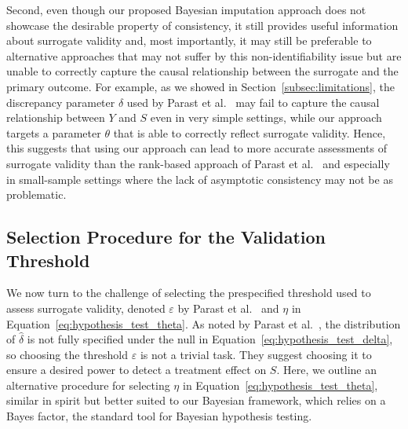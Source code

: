 \documentclass[12pt]{article}
\begin{document}
Second, even though our proposed Bayesian imputation approach does not showcase the desirable property of consistency, it still provides useful information about surrogate validity and, most importantly, it may still be preferable to alternative approaches that may not suffer by this non-identifiability issue but are unable to correctly capture the causal relationship between the surrogate and the primary outcome. For example, as we showed in Section~\ref{subsec:limitations}, the discrepancy parameter \(\delta\) used by Parast et al.\ \citep{parast2024rank} may fail to capture the causal relationship between \(Y\) and \(S\) even in very simple settings, while our approach targets a parameter \(\theta\) that is able to correctly reflect surrogate validity. Hence, this suggests that using our approach can lead to more accurate assessments of surrogate validity than the rank-based approach of Parast et al.\ \citep{parast2024rank} and especially in small-sample settings where the lack of asymptotic consistency may not be as problematic.

\subsection{Selection Procedure for the Validation Threshold}\label{subsec:alternative_threshold}

We now turn to the challenge of selecting the prespecified threshold used to assess surrogate validity, denoted \(\varepsilon\) by Parast et al.\ \citep{parast2024rank} and \(\eta\) in Equation~\eqref{eq:hypothesis_test_theta}. As noted by Parast et al.\ \citep{parast2024rank}, the distribution of \(\widehat{\delta}\) is not fully specified under the null in Equation~\eqref{eq:hypothesis_test_delta}, so choosing the threshold \(\varepsilon\) is not a trivial task. They suggest choosing it to ensure a desired power to detect a treatment effect on \(S\). Here, we outline an alternative procedure for selecting \(\eta\) in Equation~\eqref{eq:hypothesis_test_theta}, similar in spirit but better suited to our Bayesian framework, which relies on a Bayes factor, the standard tool for Bayesian hypothesis testing.
\end{document}
